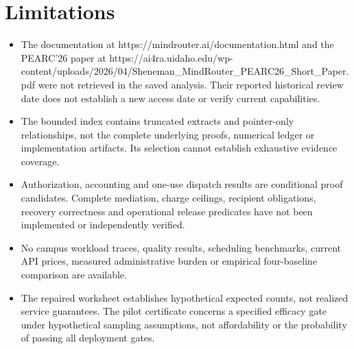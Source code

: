 \documentclass[11pt]{article}
\begin{document}
\section{Limitations}
\begin{itemize}
\item The documentation at https://mindrouter.ai/documentation.html and the PEARC'26 paper at https://ai4ra.uidaho.edu/wp-content/uploads/2026/04/Sheneman\_MindRouter\_PEARC26\_Short\_Paper.pdf were not retrieved in the saved analysis. Their reported historical review date does not establish a new access date or verify current capabilities.
\item The bounded index contains truncated extracts and pointer-only relationships, not the complete underlying proofs, numerical ledger or implementation artifacts. Its selection cannot establish exhaustive evidence coverage.
\item Authorization, accounting and one-use dispatch results are conditional proof candidates. Complete mediation, charge ceilings, recipient obligations, recovery correctness and operational release predicates have not been implemented or independently verified.
\item No campus workload traces, quality results, scheduling benchmarks, current API prices, measured administrative burden or empirical four-baseline comparison are available.
\item The repaired worksheet establishes hypothetical expected counts, not realized service guarantees. The pilot certificate concerns a specified efficacy gate under hypothetical sampling assumptions, not affordability or the probability of passing all deployment gates.
\end{itemize}
\end{document}
